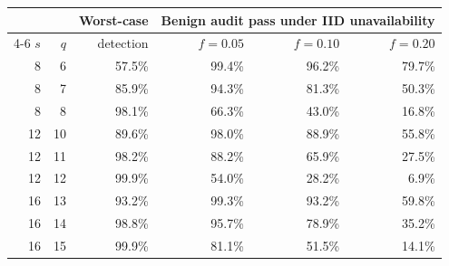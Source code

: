 \begin{tabular}{@{}rrrrrr@{}}
\toprule
 & & Worst-case & \multicolumn{3}{c}{Benign audit pass under IID unavailability}\\
\cmidrule(lr){4-6}
$s$ & $q$ & detection & $f=0.05$ & $f=0.10$ & $f=0.20$\\
\midrule
8 & 6 & 57.5\% & 99.4\% & 96.2\% & 79.7\%\\
8 & 7 & 85.9\% & 94.3\% & 81.3\% & 50.3\%\\
8 & 8 & 98.1\% & 66.3\% & 43.0\% & 16.8\%\\
12 & 10 & 89.6\% & 98.0\% & 88.9\% & 55.8\%\\
12 & 11 & 98.2\% & 88.2\% & 65.9\% & 27.5\%\\
12 & 12 & 99.9\% & 54.0\% & 28.2\% & 6.9\%\\
16 & 13 & 93.2\% & 99.3\% & 93.2\% & 59.8\%\\
16 & 14 & 98.8\% & 95.7\% & 78.9\% & 35.2\%\\
16 & 15 & 99.9\% & 81.1\% & 51.5\% & 14.1\%\\
\bottomrule
\end{tabular}
